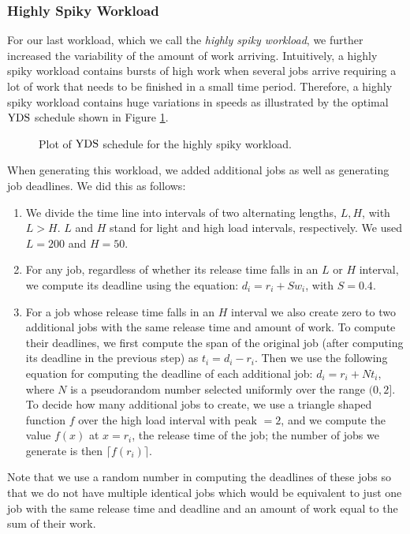 \documentclass[11pt]{article}
\newcommand{\YDS}{{\rm YDS}}
\begin{document}
\subsubsection{Highly Spiky Workload}

For our last workload, which we call the {\em highly spiky workload}, 
we further increased the variability of the amount of work arriving.
Intuitively, a highly spiky workload contains bursts of high work
when several jobs arrive requiring a lot of work that needs to be
finished in a small time period.
Therefore, a highly spiky workload
contains huge variations in speeds as illustrated by the optimal
$\YDS$ schedule shown in Figure \ref{fig:YDS_High}.

\begin{figure}
\centering
{}
\caption{Plot of $\YDS$ schedule for the highly spiky workload.}
\label{fig:YDS_High}
\end{figure}

When generating this workload, we added additional jobs as well as
generating job deadlines.
We did this as follows:
\begin{enumerate}
\item We divide the time line into intervals of two alternating
  lengths, $L, H$, with $L > H$. $L$ and $H$ stand for light and high
  load intervals, respectively. We used $L = 200$ and $H = 50$. 
\item For any job, regardless of whether its release time falls in an
  $L$ or $H$ interval, we compute its deadline using the equation:
  $d_i = r_i + Sw_i$, with $S = 0.4$.
\item For a job whose release time falls in an $H$ interval we also
  create zero to two additional jobs with the same release time and
  amount of work. To compute their deadlines, we first compute the
  span of the original job (after computing its deadline in the
  previous step) as $t_i = d_i - r_i$. Then we use the following equation
  for computing the deadline of each additional job:
	  $d_i = r_i + N t_i$, 
  where $N$ is a pseudorandom number selected uniformly over the range
  $(0,2]$.
  To decide how many additional jobs to 
  create, we use a triangle shaped function $f$ over the
  high load interval with peak $=2$, and we compute the            
  value $f(x)$ at $x = r_i$, the release time of the job; the
  number of jobs we generate is then $\lceil f(r_i) \rceil$. 
\end{enumerate}

Note that we use a random number in computing the deadlines of these
jobs so that we do not have multiple identical jobs which would be
equivalent to just one job with the same release time and
deadline and an amount of work equal to the sum of their work. 
\end{document}
